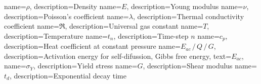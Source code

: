 {
	name={\ensuremath{\rho}},
	description={Density}
}
{
	name={\ensuremath{E}},
	description={Young modulus}
}
{
	name={\ensuremath{\nu}},
	description={Poisson's coefficient}
}
{
	name={\ensuremath{\lambda}},
	description={Thermal conductivity coefficient}
}
{
	name={\ensuremath{\mathfrak{R}}},
	description={Universal gas constant}
}
{
	name={\ensuremath{T}},
	description={Temperature}
}
{
	name={\ensuremath{t_n}},
	description={Time-step \ensuremath{n}}
}
{
	name={\ensuremath{c_{p}}},
	description={Heat coefficient at constant pressure}
}
{
	name={\ensuremath{E_{ac}\, / \, Q\, / \, G}},
	description={Activation energy for self-difussion, Gibbs free energy},
	text={\ensuremath{E_{ac}}},
}
{
	name={\ensuremath{\sigma_{Y}}},
	description={Yield stress}
}
{
	name={\ensuremath{G}},
	description={Shear modulus}
}
{
	name={\ensuremath{t_d}},
	description={Exponential decay time}
}